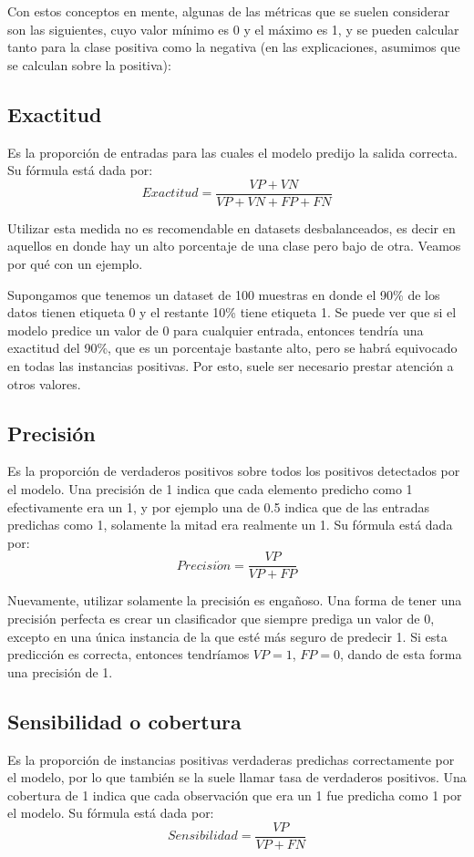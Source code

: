 \documentclass[../../main.tex]{subfiles}
\begin{document}
Con estos conceptos en mente, algunas de las métricas que se suelen considerar son las
siguientes, cuyo valor mínimo es 0 y el máximo es 1, y se pueden calcular tanto para la
clase positiva como la negativa (en las explicaciones, asumimos que se calculan sobre la
positiva):

\subsection{Exactitud}
Es la proporción de entradas para las cuales el modelo predijo la salida correcta.
Su fórmula está dada por:
\[
    Exactitud = \frac{VP + VN}{VP + VN + FP + FN}
\]

Utilizar esta medida no es recomendable en datasets desbalanceados, es decir en aquellos
en donde hay un alto porcentaje de una clase pero bajo de otra. Veamos por qué con un
ejemplo.

Supongamos que tenemos un dataset de 100 muestras en donde el 90\% de los datos tienen
etiqueta 0 y el restante 10\% tiene etiqueta 1. Se puede ver que si el modelo predice un
valor de 0 para cualquier entrada, entonces tendría una exactitud del 90\%, que es un
porcentaje bastante alto, pero se habrá equivocado en todas las instancias positivas.
Por esto, suele ser necesario prestar atención a otros valores.

\subsection{Precisión}
Es la proporción de verdaderos positivos sobre todos los positivos detectados por el
modelo. Una precisión de 1 indica que cada elemento predicho como 1 efectivamente
era un 1, y por ejemplo una de 0.5 indica que de las entradas predichas como 1,
solamente la mitad era realmente un 1. Su fórmula está dada por:
\[
    Precisi\acute{o}n = \frac{VP}{VP + FP}
\]

Nuevamente, utilizar solamente la precisión es engañoso. Una forma de tener una precisión
perfecta es crear un clasificador que siempre prediga un valor de 0, excepto en una única
instancia de la que esté más seguro de predecir 1. Si esta predicción es correcta,
entonces tendríamos \(VP=1\), \(FP=0\), dando de esta forma una precisión de 1.

\subsection{Sensibilidad o cobertura}
Es la proporción de instancias positivas verdaderas predichas correctamente por el modelo,
por lo que también se la suele llamar tasa de verdaderos positivos. Una cobertura de 1
indica que cada observación que era un 1 fue predicha como 1 por el modelo. Su fórmula
está dada por:
\[
    Sensibilidad = \frac{VP}{VP + FN}
\]
\end{document}
